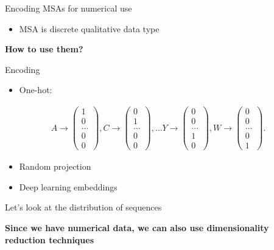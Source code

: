 \documentclass[presentation,smaller]{beamer}
\begin{document}
\begin{frame}[label={sec:orgc02bc99}]{Encoding MSAs for numerical use}
\begin{itemize}
\item MSA is discrete qualitative data type
\end{itemize}

\begin{center}
\textbf{How to use them?}
\end{center}

\begin{block}{Encoding}
\begin{itemize}
\item One-hot:
\end{itemize}
\begin{equation*}
\begin{split}
A \rightarrow \begin{pmatrix} 1\\ 0\\ \dots \\ 0\\ 0 \end{pmatrix},
C \rightarrow \begin{pmatrix} 0\\ 1\\ \dots \\ 0\\ 0 \end{pmatrix},
\dots
Y \rightarrow \begin{pmatrix} 0\\ 0\\ \dots \\ 1\\ 0 \end{pmatrix},
W \rightarrow \begin{pmatrix} 0\\ 0\\ \dots \\ 0\\ 1 \end{pmatrix}.
\end{split}
\end{equation*}
\begin{itemize}
\item Random projection
\item Deep learning embeddings
\end{itemize}
\end{block}
\end{frame}

\begin{frame}[label={sec:org197a352}]{Let's look at the distribution of sequences}
\begin{center}
\Large \textbf{Since we have numerical data, we can also use dimensionality reduction techniques}
\end{center}
\end{frame}
\end{document}
